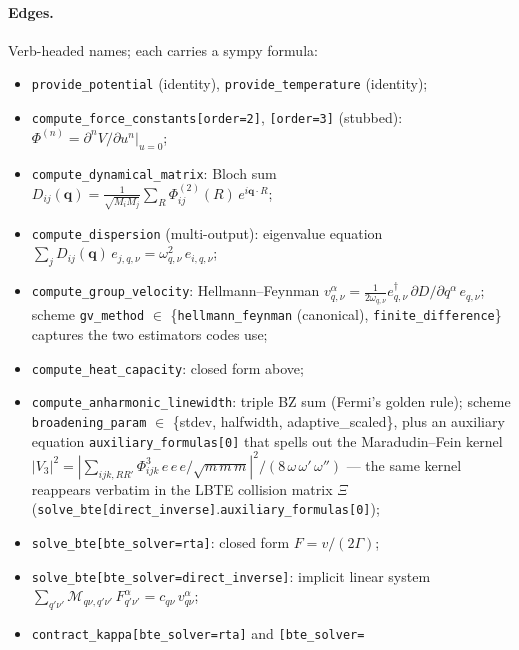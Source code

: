 \documentclass[11pt,a4paper]{article}
\begin{document}
\paragraph{Edges.} Verb-headed names; each carries a sympy formula:
\begin{itemize}[leftmargin=2em, itemsep=0.2em]
  \item \texttt{provide\_potential} (identity), \texttt{provide\_temperature} (identity);
  \item \texttt{compute\_force\_constants[order=2]}, \texttt{[order=3]} (stubbed):
        $\Phi^{(n)} = \partial^n V / \partial u^n |_{u=0}$;
  \item \texttt{compute\_dynamical\_matrix}: Bloch sum
        $D_{ij}(\mathbf{q}) = \frac{1}{\sqrt{M_i M_j}}\sum_R \Phi^{(2)}_{ij}(R)\,
        e^{i\mathbf{q}\cdot R}$;
  \item \texttt{compute\_dispersion} (multi-output): eigenvalue equation
        $\sum_j D_{ij}(\mathbf{q})\, e_{j,q,\nu} = \omega^2_{q,\nu}\, e_{i,q,\nu}$;
  \item \texttt{compute\_group\_velocity}: Hellmann--Feynman
        $v^\alpha_{q,\nu} = \frac{1}{2\omega_{q,\nu}} e^\dagger_{q,\nu}\,
        \partial D / \partial q^\alpha\, e_{q,\nu}$; scheme
        \texttt{gv\_method} $\in$ \{\texttt{hellmann\_feynman} (canonical),
        \texttt{finite\_difference}\} captures the two estimators codes use;
  \item \texttt{compute\_heat\_capacity}: closed form above;
  \item \texttt{compute\_anharmonic\_linewidth}: triple BZ sum (Fermi's golden rule);
        scheme \texttt{broadening\_param} $\in$ \{stdev,
        halfwidth, adaptive\_scaled\}, plus an auxiliary equation
        \texttt{auxiliary\_formulas[0]} that spells out the Maradudin--Fein
        kernel $|V_3|^2 = |\sum_{ijk,RR'} \Phi^3_{ijk}\, e\, e\, e /
        \sqrt{m\,m\,m}|^2 / (8\, \omega\, \omega'\, \omega'')$ ---
        the same kernel reappears verbatim in the LBTE collision matrix
        $\Xi$
        (\texttt{solve\_bte[direct\_inverse]}.\allowbreak\texttt{auxiliary\_formulas[0]});
  \item \texttt{solve\_bte[bte\_solver=rta]}: closed form $F = v/(2\Gamma)$;
  \item \texttt{solve\_bte[bte\_solver=direct\_inverse]}: implicit linear system
        $\sum_{q'\nu'} \mathcal{M}_{q\nu,q'\nu'}\, F^\alpha_{q'\nu'} = c_{q\nu}\,
        v^\alpha_{q\nu}$;
  \item \texttt{contract\_kappa[bte\_solver=rta]} and \texttt{[bte\_solver=
}
\end{itemize}
\end{document}
